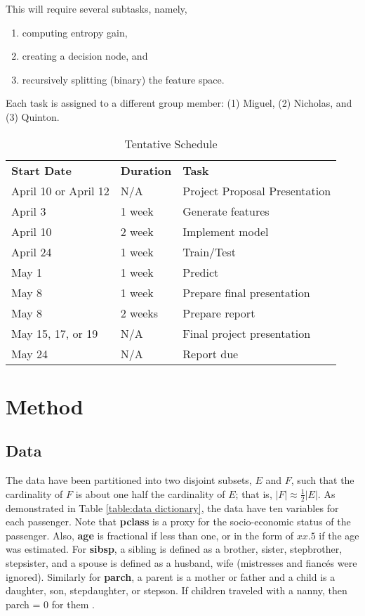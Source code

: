 \documentclass[12pt]{amsproc}
\theoremstyle{definition}
\begin{document}
	This will require several subtasks, namely,
	
	\begin{enumerate}
		\item computing entropy gain,
		\item creating a decision node, and
		\item recursively splitting (binary) the feature space. 
	\end{enumerate}
	
	Each task is assigned to a different group member: (1) Miguel, (2) Nicholas, and (3) Quinton. 


	\begin{table}[h!]
		\centering
		\caption{Tentative Schedule}
		\label{Tentative Schedule}
		\begin{tabular}{lll}
			\textbf{Start Date} & \textbf{Duration} & \textbf{Task} \\
			April 10 or April 12 & N/A & Project Proposal Presentation \\
			April 3 & 1 week & Generate features \\
			April 10 & 2 week & Implement model \\
			April 24 & 1 week & Train/Test \\
			May 1 & 1 week & Predict \\
			May 8 & 1 week & Prepare final presentation \\
			May 8 & 2 weeks & Prepare report \\
			May 15, 17, or 19 & N/A & Final project presentation \\
			May 24 & N/A & Report due
		\end{tabular}
	\end{table}
	
	
	\section{Method}\label{method}
	
	\subsection{Data}\label{method:data}
	The data have been partitioned into two disjoint subsets, $E$ and $F$, such that the cardinality of $F$ is about one half the cardinality of $E$; that is, $|F| \approx \frac{1}{2} |E|$. As demonstrated in Table \ref{table:data dictionary}, the data have ten variables for each passenger. Note that \textbf{pclass} is a proxy for the socio-economic status of the passenger. Also, \textbf{age} is fractional if less than one, or in the form of $xx.5$ if the age was estimated. For \textbf{sibsp}, a sibling is defined as a brother, sister, stepbrother, stepsister, and a spouse is defined as a husband, wife (mistresses and fianc\'{e}s were ignored). Similarly for \textbf{parch}, a parent is a mother or father and a child is a daughter, son, stepdaughter, or stepson. If children traveled with a nanny, then parch = 0 for them \cite{kaggle}.
	 
\end{document}

